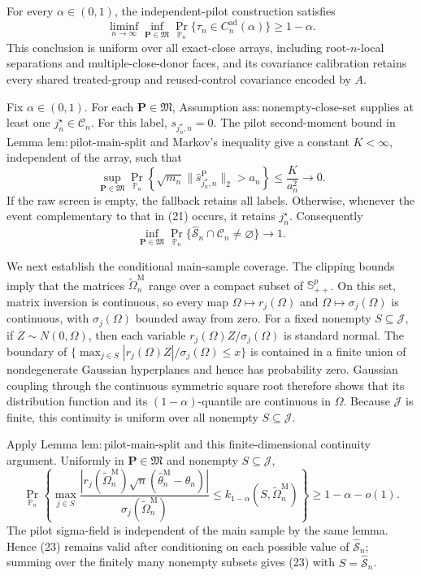 For every \(\alpha\in(0,1)\), the independent-pilot construction satisfies
\[
 \liminf_{n\to\infty}\inf_{\mathbf P\in\mathfrak M}
 \Pr_{\mathbb P_n}\{\tau_n\in C_n^{\mathrm{ad}}(\alpha)\}
 \ge1-\alpha.
\]
This conclusion is uniform over all exact-close arrays, including root-\(n\)-local separations and multiple-close-donor faces, and its covariance calibration retains every shared treated-group and reused-control covariance encoded by \(A\).

Fix \(\alpha\in(0,1)\).  For each \(\mathbf P\in\mathfrak M\), Assumption \(\mathrm{ass:nonempty\text{-}close\text{-}set}\) supplies at least one \(j_n^\star\in\mathcal C_n\).  For this label, \(s_{j_n^\star,n}=0\).  The pilot second-moment bound in Lemma \(\mathrm{lem:pilot\text{-}main\text{-}split}\) and Markov's inequality give a constant \(K<\infty\), independent of the array, such that
\[
 \sup_{\mathbf P\in\mathfrak M}
 \Pr_{\mathbb P_n}\!\left\{
 \sqrt{m_n}\|\widehat s_{j_n^\star,n}^{\mathrm P}\|_2>a_n
 \right\}
 \le \frac K{a_n^2}\longrightarrow0.
\tag{21}
\]
If the raw screen is empty, the fallback retains all labels.  Otherwise, whenever the event complementary to that in (21) occurs, it retains \(j_n^\star\).  Consequently
\[
 \inf_{\mathbf P\in\mathfrak M}
 \Pr_{\mathbb P_n}\{\widehat{\mathcal S}_n\cap\mathcal C_n\ne\varnothing\}
 \longrightarrow1.
\tag{22}
\]

We next establish the conditional main-sample coverage.  The clipping bounds imply that the matrices \(\widetilde\Omega_n^{\mathrm M}\) range over a compact subset of \(\mathbb S_{++}^p\).  On this set, matrix inversion is continuous, so every map \(\Omega\mapsto r_j(\Omega)\) and \(\Omega\mapsto\sigma_j(\Omega)\) is continuous, with \(\sigma_j(\Omega)\) bounded away from zero.  For a fixed nonempty \(S\subseteq\mathcal J\), if \(Z\sim N(0,\Omega)\), then each variable \(r_j(\Omega)Z/\sigma_j(\Omega)\) is standard normal.  The boundary of
\(
 \{\max_{j\in S}|r_j(\Omega)Z|/\sigma_j(\Omega)\le x\}
\)
is contained in a finite union of nondegenerate Gaussian hyperplanes and hence has probability zero.  Gaussian coupling through the continuous symmetric square root therefore shows that its distribution function and its \((1-\alpha)\)-quantile are continuous in \(\Omega\).  Because \(\mathcal J\) is finite, this continuity is uniform over all nonempty \(S\subseteq\mathcal J\).

Apply Lemma \(\mathrm{lem:pilot\text{-}main\text{-}split}\) and this finite-dimensional continuity argument.  Uniformly in \(\mathbf P\in\mathfrak M\) and nonempty \(S\subseteq\mathcal J\),
\[
 \Pr_{\mathbb P_n}\!\left\{
  \max_{j\in S}
  \frac{|r_j(\widetilde\Omega_n^{\mathrm M})
  \sqrt n(\widehat\theta_n^{\mathrm M}-\theta_n)|}
  {\sigma_j(\widetilde\Omega_n^{\mathrm M})}
  \le k_{1-\alpha}(S,\widetilde\Omega_n^{\mathrm M})
 \right\}
 \ge1-\alpha-o(1).
\tag{23}
\]
The pilot sigma-field is independent of the main sample by the same lemma.  Hence (23) remains valid after conditioning on each possible value of \(\widehat{\mathcal S}_n\); summing over the finitely many nonempty subsets gives (23) with \(S=\widehat{\mathcal S}_n\).

